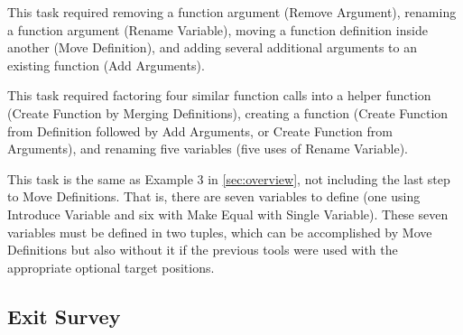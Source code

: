 \begin{figure}[h]
\end{figure}


This task required removing a function argument (Remove Argument), renaming a
function argument (Rename Variable), moving a function definition inside another
(Move Definition), and adding several additional arguments to an existing
function (Add Arguments).

\begin{figure}[h]
\end{figure}

\clearpage


This task required factoring four similar function calls into a helper function
(Create Function by Merging Definitions), 
creating a function (Create Function from Definition followed by Add Arguments,
or Create Function from Arguments), and renaming five variables (five uses of
Rename Variable).

\begin{figure}[h]
\end{figure}



This task is the same as Example 3 in \autoref{sec:overview}, not including the
last step to Move Definitions. That is, there are seven variables to define
(one using Introduce Variable and six with Make Equal with Single Variable).
These seven variables must be defined in two tuples, which can be accomplished
by Move Definitions but also without it if the previous tools were used with the
appropriate optional target positions.

\begin{figure}[h]
\end{figure}



\clearpage

\subsection{Exit Survey}

